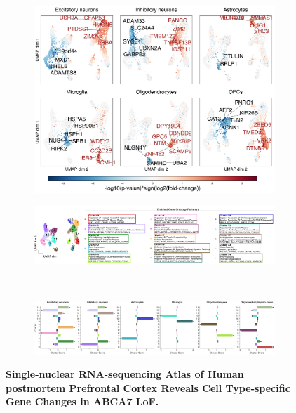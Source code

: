 \documentclass[12pt]{article}
\begin{document}
\begin{figure}[H]
\begin{subfigure}[t]{.5\textwidth}
\begin{subfigure}[t]{.5\textwidth}
        \end{subfigure}
    \\[-3ex] 
    \end{subfigure}
    \begin{subfigure}[t]{0.5\textwidth}
        \caption{}
        \includegraphics[width=\textwidth]{./main_plots/umap_projection_top_genes.png}        
    \end{subfigure}
    \begin{subfigure}[t]{\textwidth}
        \caption{}
        \includegraphics[width=\textwidth]{./main_plots/clusters_umap.png}        
    \end{subfigure}
    \\[-2ex] 
    \begin{subfigure}[t]{\textwidth}
        \caption{}
        \includegraphics[width=\textwidth]{./main_plots/clusters_bars.png}        
    \end{subfigure}
    \caption{
        \textbf{Single-nuclear RNA-sequencing Atlas of Human postmortem Prefrontal Cortex Reveals Cell Type-specific Gene Changes in ABCA7 LoF.}\\
        }
    \label{fig:main_atlas}
\end{figure}
\end{document}
